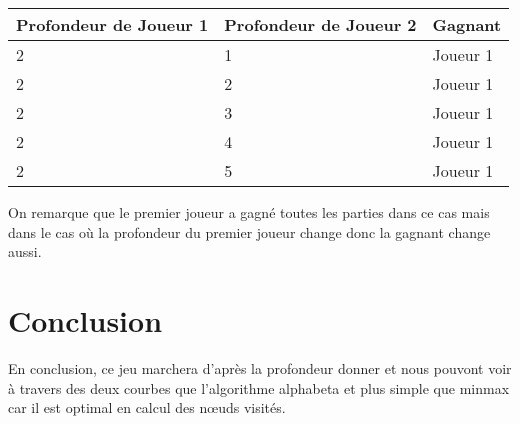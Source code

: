 \documentclass[11pt, pdflatex]{report}
\begin{document}
\begin{center}
    \begin{tabular}{|l|l|l|}\hline   
        Profondeur de Joueur 1\up{er}&      Profondeur de Joueur 2\up{ème}&      Gagnant      \\\hline
    2&      1&      Joueur 1\up{er}      \\\hline
    2&      2&      Joueur 1\up{er}      \\\hline
    2&      3&      Joueur 1\up{er}      \\\hline
    2&      4&      Joueur 1\up{er}      \\\hline
    2&      5&      Joueur 1\up{er}      \\\hline
    \end{tabular}
\end{center}

On remarque que le premier joueur a gagné toutes les parties dans ce cas mais dans le cas où la profondeur du premier joueur change donc la gagnant change aussi.\par

\section{Conclusion}
En conclusion, ce jeu marchera d’après la profondeur donner et nous pouvont voir à travers des deux courbes que l’algorithme alphabeta et plus simple que minmax car il est optimal en calcul des nœuds visités. 
\end{document}
